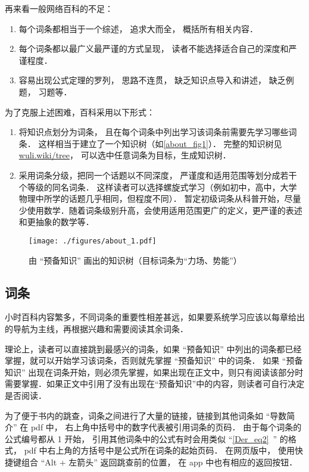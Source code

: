 再来看一般网络百科的不足：
\begin{enumerate}
\item 每个词条都相当于一个综述， 追求大而全， 概括所有相关内容．
\item 每个词条都以最广义最严谨的方式呈现， 读者不能选择适合自己的深度和严谨程度．
\item 容易出现公式定理的罗列， 思路不连贯， 缺乏知识点导入和讲述， 缺乏例题， 习题等．
\end{enumerate}

为了克服上述困难，百科采用以下形式：
\begin{enumerate}
\item 将知识点划分为词条， 且在每个词条中列出学习该词条前需要先学习哪些词条． 这样相当于建立了一个知识树（如\autoref{about_fig1}）． 完整的知识树见 \href{https://wuli.wiki/tree}{wuli.wiki/tree}， 可以选中任意词条为目标，生成知识树．
\item 采用词条分级，把同一个话题以不同深度， 严谨度和适用范围等划分成若干个等级的同名词条． 这样读者可以选择螺旋式学习（例如初中，高中，大学物理中所学的话题几乎相同，但程度不同）． 暂定初级词条从科普开始，尽量少使用数学．随着词条级别升高，会使用适用范围更广的定义，更严谨的表述和更抽象的数学等．
\end{enumerate}

\begin{figure}[ht]
\centering
\texttt{[image: ./figures/about\_1.pdf]}
\caption{由 “预备知识” 画出的知识树（目标词条为“力场、势能”）}\label{about_fig1}
\end{figure}

\subsection{词条}
小时百科内容繁多，不同词条的重要性相差甚远，如果要系统学习应该以每章给出的导航为主线，再根据兴趣和需要阅读其余词条．

理论上，读者可以直接跳到最感兴的词条，如果 “预备知识” 中列出的词条都已经掌握，就可以开始学习该词条，否则就先掌握 “预备知识” 中的词条． 如果 “预备知识” 出现在词条开始，则必须先掌握，如果出现在正文中，则只有阅读该部分时需要掌握．如果正文中引用了没有出现在“预备知识”中的内容，则读者可自行决定是否阅读．

为了便于书内的跳查，词条之间进行了大量的链接，链接到其他词条如 “导数简介” 在 pdf 中， 右上角中括号中的数字代表被引用词条的页码． 由于每个词条的公式编号都从 1 开始， 引用其他词条中的公式有时会用类似 “\autoref{Der_eq2}~” 的格式， pdf 中右上角的方括号中是公式所在词条的起始页码． 在网页版中， 使用快捷键组合 “Alt + 左箭头” 返回跳查前的位置， 在 app 中也有相应的返回按钮．
